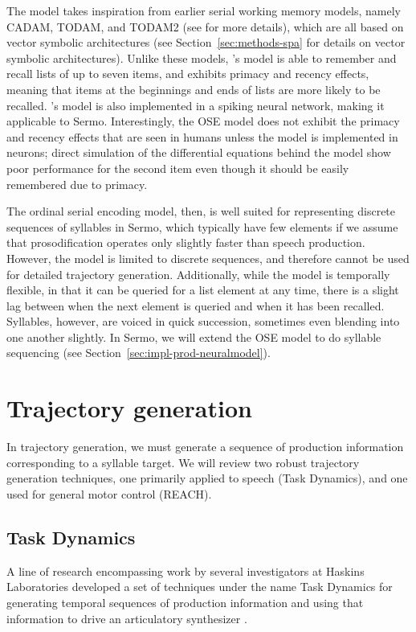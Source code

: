The model takes inspiration from
earlier serial working memory models,
namely CADAM, TODAM, and TODAM2
(see \citealt{choo2010} for more details),
which are all based on
vector symbolic architectures
(see Section~\ref{sec:methods-spa}
for details on vector symbolic architectures).
Unlike these models,
\citeauthor{choo2010}'s model
is able to remember and recall
lists of up to seven items,
and exhibits primacy and recency effects,
meaning that items at the beginnings
and ends of lists are more likely
to be recalled.
\citeauthor{choo2010}'s model is also implemented
in a spiking neural network,
making it applicable to Sermo.
Interestingly,
the OSE model does not exhibit
the primacy and recency effects
that are seen in humans
unless the model
is implemented in neurons;
direct simulation of the differential equations
behind the model show
poor performance for the second item
even though it should be easily remembered
due to primacy.

The ordinal serial encoding model,
then, is well suited for representing
discrete sequences of syllables in Sermo,
which typically have few elements
if we assume that prosodification
operates only slightly faster
than speech production.
However, the model is limited to
discrete sequences,
and therefore cannot be used
for detailed trajectory generation.
Additionally,
while the model is temporally flexible,
in that it can be queried for
a list element at any time,
there is a slight lag between
when the next element is queried
and when it has been recalled.
Syllables, however, are voiced in quick succession,
sometimes even blending into one another slightly.
In Sermo, we will extend the OSE model
to do syllable sequencing
(see Section~\ref{sec:impl-prod-neuralmodel}).

\section{Trajectory generation}

In trajectory generation,
we must generate a sequence
of production information
corresponding to a syllable target.
We will review two robust trajectory generation techniques,
one primarily applied to speech
(Task Dynamics),
and one used for general motor control
(REACH).

\subsection{Task Dynamics}

A line of research encompassing work by
several investigators at Haskins Laboratories
developed a set of techniques
under the name Task Dynamics
for generating temporal sequences
of production information
and using that information to drive
an articulatory synthesizer
\citep{saltzman1989,nam2004}.


